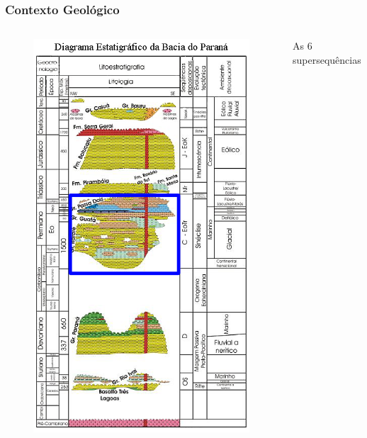 \documentclass[aspectratio=10]{beamer} %
\begin{document}
\begin{frame}
\frametitle{Contexto Geológico}
\begin{columns}
\begin{column}{0.4\textwidth}
\begin{figure}
\includegraphics[scale=0.36]{Imagens/diagramagondwanai.png}
\end{figure}
\end{column}
\begin{column}{0.55\textwidth}
\begin{block}{As $6$ supersequências}


\end{block}
\end{column}
\end{columns}
\end{frame}
\end{document}
